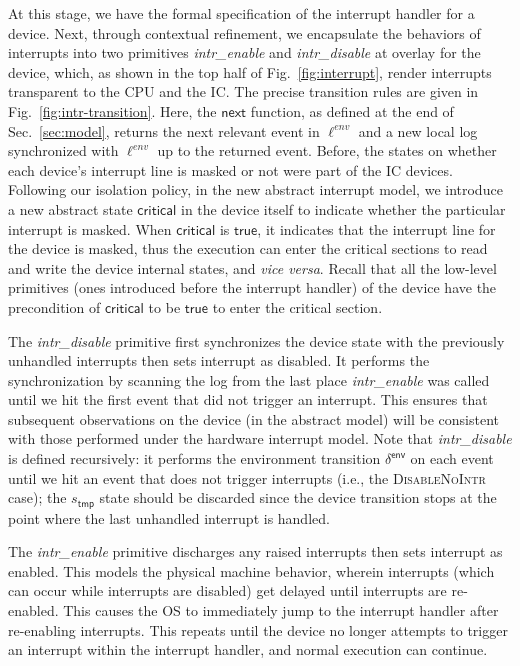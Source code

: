 At this stage, we have the formal specification of the interrupt
handler for a device.  Next, through contextual refinement, we
encapsulate the behaviors of interrupts into two primitives {\it
  intr\_enable} and {\it intr\_disable} at overlay for the device,
which, as shown in the top half of Fig.~\ref{fig:interrupt}, render
interrupts transparent to the CPU and the IC.  The precise
transition rules are given in Fig.~\ref{fig:intr-transition}. 
Here, the $\textsf{next}$
function, as defined at the end of Sec.~\ref{sec:model}, returns the
next relevant event in $\ell^{env}$ and a new local log synchronized
with $\ell^{env}$ up to the returned event. Before,
the states on whether each device's interrupt line is masked or not
were part of the IC devices. Following our isolation policy, in the
new abstract interrupt model, we introduce a new abstract state
$\textsf{critical}$ in the device itself to indicate whether the particular
interrupt is masked. When $\textsf{critical}$ is $\textsf{true}$,
it indicates that the interrupt line for the device is masked, thus
the execution can enter the critical sections to read and write the device
internal states, and {\it vice versa}. Recall that all the low-level
primitives (ones introduced before the interrupt handler) of the device
have the precondition of $\textsf{critical}$ to be 
$\textsf{true}$ to enter the critical section.

The {\it intr\_disable} primitive first synchronizes the device state
with the previously unhandled interrupts then sets interrupt as
disabled.  It performs the synchronization by scanning the log from
the last place {\it intr\_enable} was called until we hit the first
event that did not trigger an interrupt.  This ensures that
subsequent observations on the device (in the abstract model) will be
consistent with those performed under the hardware interrupt model.
Note that {\it intr\_disable} is defined recursively: it performs the
environment transition $\delta^{\textsf{env}}$ on each event until we
hit an event that does not trigger interrupts (i.e., the
\textsc{DisableNoIntr} case); the $s_{\textsf{tmp}}$ state should be 
discarded since the device
transition stops at the point where the last unhandled interrupt is
handled.

The {\it intr\_enable} primitive discharges any raised interrupts
then sets interrupt as enabled. This models the physical machine
behavior, wherein interrupts (which can occur while interrupts are
disabled) get delayed until interrupts are re-enabled. This causes the
OS to immediately jump to the interrupt handler after re-enabling
interrupts. This repeats until the device no longer attempts to
trigger an interrupt within the interrupt handler, and normal
execution can continue.

